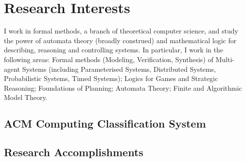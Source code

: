 \documentclass[11pt,a4paper,sans]{moderncv}
\begin{document}
\section{Research Interests}
I work in formal methods, a branch of theoretical computer science, and study the power of automata theory (broadly construed) and mathematical logic for describing, reasoning and controlling systems. In particular, 
I work in the following areas: Formal methods (Modeling, Verification, Synthesis) of Multi-agent Systems (including Parameterised Systems, Distributed Systems, Probabilistic Systems, Timed Systems);  Logics for Games and Strategic Reasoning; Foundations of Planning; Automata Theory; Finite and Algorithmic Model Theory.


\subsection{ACM Computing Classification System}





\subsection{Research Accomplishments} %
\end{document}
